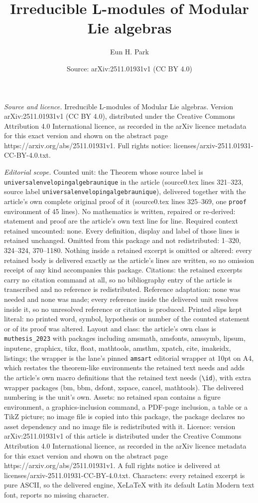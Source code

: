 \documentclass[10pt,a4paper]{amsart}
\title[Irreducible L-modules of Modular Lie algebras]{Irreducible L-modules of Modular Lie algebras}
\author{Eun H. Park}
\date{Source: arXiv:2511.01931v1 (CC BY 4.0)}
\begin{document}
\maketitle

\noindent\emph{Source and licence.} Irreducible L-modules of Modular Lie algebras. Version arXiv:2511.01931v1 (CC BY 4.0), distributed under the Creative Commons Attribution 4.0 International licence, as recorded in the arXiv licence metadata for this exact version and shown on the abstract page https://arxiv.org/abs/2511.01931v1. Full rights notice: licenses/arxiv-2511.01931-CC-BY-4.0.txt.\par\smallskip

\noindent\textit{Editorial scope.} Counted unit: the Theorem whose source label is \texttt{universalenvelopingalgebraunique} in the article (source0.tex lines 321--323, source label \texttt{universalenvelopingalgebraunique}), delivered together with the article's own complete original proof of it (source0.tex lines 325--369, one \texttt{proof} environment of 45 lines). No mathematics is written, repaired or re-derived: statement and proof are the article's own text line for line. Required context retained uncounted: none. Every definition, display and label of those lines is retained unchanged. Omitted from this package and not redistributed: 1--320, 324--324, 370--1180. Nothing inside a retained excerpt is omitted or altered: every retained body is delivered exactly as the article's lines are written, so no omission receipt of any kind accompanies this package. Citations: the retained excerpts carry no citation command at all, so no bibliography entry of the article is transcribed and no reference is redistributed. Reference adaptation: none was needed and none was made; every reference inside the delivered unit resolves inside it, so no unresolved reference or citation is produced. Printed slips kept literal: no printed word, symbol, hypothesis or number of the counted statement or of its proof was altered. Layout and class: the article's own class is \texttt{muthesis\_2023} with packages including amsmath, amsfonts, amssymb, lipsum, inputenc, graphicx, tikz, float, mathtools, amsthm, xpatch, cite, imakeidx, listings; the wrapper is the lane's pinned \texttt{amsart} editorial wrapper at 10pt on A4, which restates the theorem-like environments the retained text needs and adds the article's own macro definitions that the retained text needs (\texttt{\textbackslash id}), with extra wrapper packages (bm, bbm, dsfont, xspace, cancel, mathtools). The delivered numbering is the unit's own. Assets: no retained span contains a figure environment, a graphics-inclusion command, a PDF-page inclusion, a table or a TikZ picture; no image file is copied into this package, the package declares no asset dependency and no image file is redistributed with it. Licence: version arXiv:2511.01931v1 of this article is distributed under the Creative Commons Attribution 4.0 International licence, as recorded in the arXiv licence metadata for this exact version and shown on the abstract page https://arxiv.org/abs/2511.01931v1. A full rights notice is delivered at licenses/arxiv-2511.01931-CC-BY-4.0.txt. Characters: every retained excerpt is pure ASCII, so the delivered engine, XeLaTeX with its default Latin Modern text font, reports no missing character.
\end{document}
